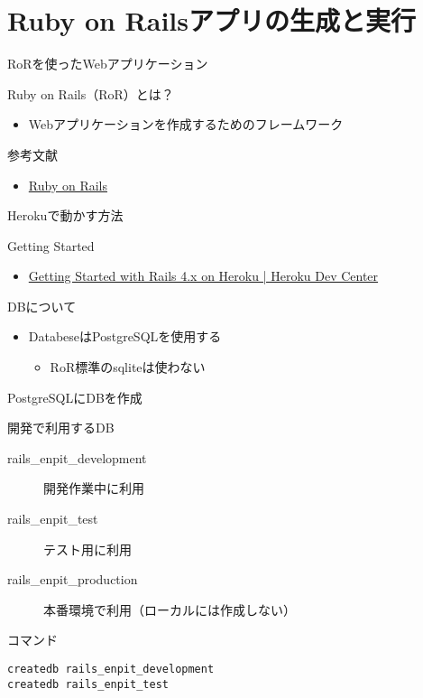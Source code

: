 \documentclass[t, aspectratio=169]{beamer}
\begin{document}
\section{Ruby on Railsアプリの生成と実行}
\label{sec-6-1}
\begin{frame}[label=sec-6-1-1]{RoRを使ったWebアプリケーション}
\begin{block}{Ruby on Rails（RoR）とは？}
\begin{itemize}
\item Webアプリケーションを作成するためのフレームワーク
\end{itemize}
\end{block}

\begin{block}{参考文献}
\begin{itemize}
\item \href{http://rubyonrails.org/}{Ruby on Rails}
\end{itemize}
\end{block}
\end{frame}
\begin{frame}[label=sec-6-1-2]{Herokuで動かす方法}
\begin{block}{Getting Started}
\begin{itemize}
\item \href{https://devcenter.heroku.com/articles/getting-started-with-rails4}{Getting Started with Rails 4.x on Heroku | Heroku Dev Center}
\end{itemize}
\end{block}
\begin{block}{DBについて}
\begin{itemize}
\item DatabeseはPostgreSQLを使用する
\begin{itemize}
\item RoR標準のsqliteは使わない
\end{itemize}
\end{itemize}
\end{block}
\end{frame}

\begin{frame}[fragile,label=sec-6-1-3]{PostgreSQLにDBを作成}
 \begin{block}{開発で利用するDB}
\begin{description}
\item[{rails\_enpit\_development}] 開発作業中に利用
\item[{rails\_enpit\_test}] テスト用に利用
\item[{rails\_enpit\_production}] 本番環境で利用（ローカルには作成しない）
\end{description}
\end{block}

\begin{block}{コマンド}
\begin{verbatim}
createdb rails_enpit_development
createdb rails_enpit_test
\end{verbatim}
\end{block}
\end{frame}
\end{document}
